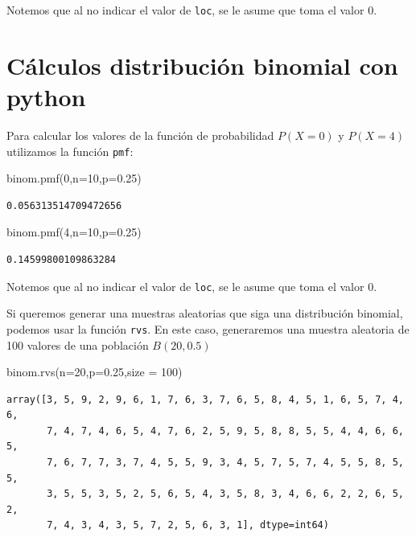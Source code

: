 \documentclass[
  letterpaper,
  DIV=11,
  numbers=noendperiod]{scrreprt}
\newenvironment{Shaded}{\begin{snugshade}}{\end{snugshade}}
\newcommand{\DecValTok}[1]{\textcolor[rgb]{0.68,0.00,0.00}{#1}}
\newcommand{\FloatTok}[1]{\textcolor[rgb]{0.68,0.00,0.00}{#1}}
\newcommand{\NormalTok}[1]{\textcolor[rgb]{0.00,0.23,0.31}{#1}}
\newcommand{\OperatorTok}[1]{\textcolor[rgb]{0.37,0.37,0.37}{#1}}
\begin{document}
Notemos que al no indicar el valor de \texttt{loc}, se le asume que toma
el valor 0.

\section{Cálculos distribución binomial con
python}\label{cuxe1lculos-distribuciuxf3n-binomial-con-python-1}

Para calcular los valores de la función de probabilidad \(P(X=0)\) y
\(P(X=4)\) utilizamos la función \texttt{pmf}:

\begin{Shaded}
\begin{Highlighting}[]
\NormalTok{binom.pmf(}\DecValTok{0}\NormalTok{,n}\OperatorTok{=}\DecValTok{10}\NormalTok{,p}\OperatorTok{=}\FloatTok{0.25}\NormalTok{)}
\end{Highlighting}
\end{Shaded}

\begin{verbatim}
0.056313514709472656
\end{verbatim}

\begin{Shaded}
\begin{Highlighting}[]
\NormalTok{binom.pmf(}\DecValTok{4}\NormalTok{,n}\OperatorTok{=}\DecValTok{10}\NormalTok{,p}\OperatorTok{=}\FloatTok{0.25}\NormalTok{)}
\end{Highlighting}
\end{Shaded}

\begin{verbatim}
0.14599800109863284
\end{verbatim}

Notemos que al no indicar el valor de \texttt{loc}, se le asume que toma
el valor 0.

Si queremos generar una muestras aleatorias que siga una distribución
binomial, podemos usar la función \texttt{rvs}. En este caso,
generaremos una muestra aleatoria de 100 valores de una población
\(B(20,0.5)\)

\begin{Shaded}
\begin{Highlighting}[]
\NormalTok{binom.rvs(n}\OperatorTok{=}\DecValTok{20}\NormalTok{,p}\OperatorTok{=}\FloatTok{0.25}\NormalTok{,size }\OperatorTok{=} \DecValTok{100}\NormalTok{)}
\end{Highlighting}
\end{Shaded}

\begin{verbatim}
array([3, 5, 9, 2, 9, 6, 1, 7, 6, 3, 7, 6, 5, 8, 4, 5, 1, 6, 5, 7, 4, 6,
       7, 4, 7, 4, 6, 5, 4, 7, 6, 2, 5, 9, 5, 8, 8, 5, 5, 4, 4, 6, 6, 5,
       7, 6, 7, 7, 3, 7, 4, 5, 5, 9, 3, 4, 5, 7, 5, 7, 4, 5, 5, 8, 5, 5,
       3, 5, 5, 3, 5, 2, 5, 6, 5, 4, 3, 5, 8, 3, 4, 6, 6, 2, 2, 6, 5, 2,
       7, 4, 3, 4, 3, 5, 7, 2, 5, 6, 3, 1], dtype=int64)
\end{verbatim}
\end{document}
